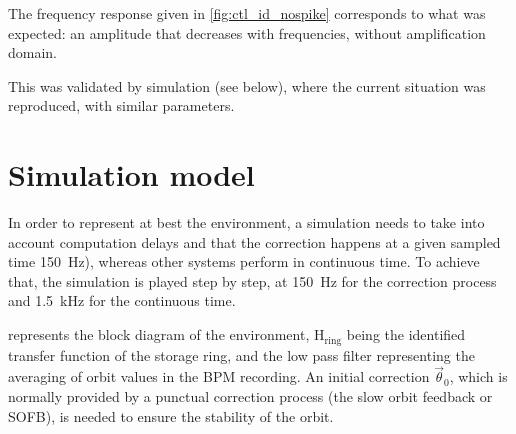 The frequency response given in \cref{fig:ctl_id_nospike} corresponds to what was expected: an amplitude that decreases with frequencies, without amplification domain. 

This was validated by simulation (see below), where the current situation was reproduced, with similar parameters.

\section{Simulation model}
\label{sec:correction_simulation}

In order to represent at best the environment, a simulation needs to take into account computation delays and that the correction happens at a given sampled time \SI{150}{\hertz}), whereas other systems perform in continuous time. To achieve that, the simulation is played step by step, at \SI{150}{\hertz} for the correction process and \SI{1.5}{\kilo\hertz} for the continuous time.

 represents the block diagram of the environment, $\text{H}_\text{ring}$ being the identified transfer function of the storage ring, and the low pass filter representing the averaging of orbit values in the BPM recording. An initial correction $\vec{\theta}_0$, which is normally provided by a punctual correction process (the slow orbit feedback or SOFB), is needed to ensure the stability of the orbit.

